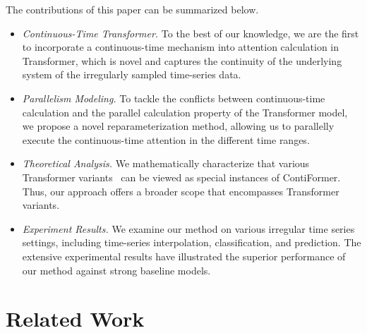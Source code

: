 \documentclass{article}
\begin{document}
The contributions of this paper can be summarized below.
\begin{itemize}[leftmargin=5mm]
    \item \textit{Continuous-Time Transformer.} To the best of our knowledge, we are the first to incorporate a continuous-time mechanism into attention calculation in Transformer, which is novel and captures the continuity of the underlying system of the irregularly sampled time-series data. 
    \item \textit{Parallelism Modeling.} To tackle the conflicts between continuous-time calculation and the parallel calculation property of the Transformer model, we propose a novel reparameterization method, allowing us to parallelly execute the continuous-time attention in the different time ranges. 
    \item \textit{Theoretical Analysis.} We mathematically characterize that various Transformer variants~\cite{xu2019self, li2020time, zhang2019attain, shukla2021multi, ma2022non} can be viewed as special instances of ContiFormer. Thus, our approach offers a broader scope that encompasses Transformer variants.
    \item \textit{Experiment Results.} We examine our method on various irregular time series settings, including time-series interpolation, classification, and prediction. The extensive experimental results have illustrated the superior performance of our method against strong baseline models.
\end{itemize}

\section{Related Work}
\end{document}
